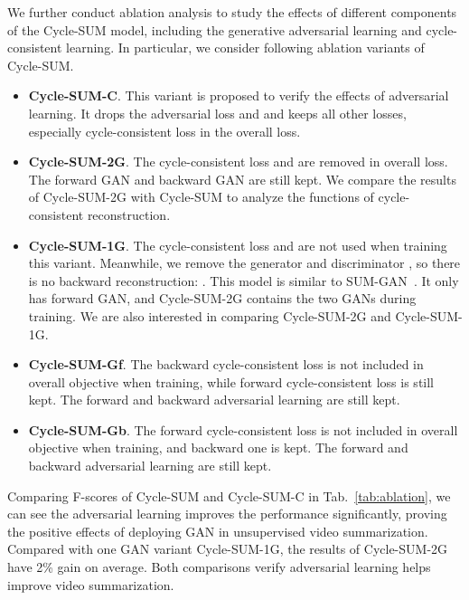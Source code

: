 \documentclass[letterpaper]{article} \usepackage{aaai19}  \usepackage{times}  \usepackage{helvet}  \usepackage{courier}  \usepackage{url}  \usepackage{graphicx}  \frenchspacing  \setlength{\pdfpagewidth}{8.5in}  \setlength{\pdfpageheight}{11in}  \usepackage{amsmath}
\begin{document}
We further conduct ablation analysis to study the effects of different components of the Cycle-SUM model, including the generative adversarial learning and cycle-consistent learning. In particular, we consider following ablation variants of Cycle-SUM.
\begin{itemize}

\item \textbf{Cycle-SUM-C}. This variant is proposed to verify the effects of adversarial learning. It drops the adversarial loss  and  and keeps all other losses, especially cycle-consistent loss  in the overall loss.

\item \textbf{Cycle-SUM-2G}. The cycle-consistent loss  and  are removed in overall loss. The forward GAN and backward GAN are still kept. We compare the results of Cycle-SUM-2G with Cycle-SUM to analyze the functions of cycle-consistent reconstruction.

\item \textbf{Cycle-SUM-1G}. The cycle-consistent loss  and  are not used when training this variant. Meanwhile, we remove the generator  and discriminator , so there is no backward reconstruction: . This model is similar to SUM-GAN~\cite{mahasseni2017unsupervised}. It only has forward GAN, and Cycle-SUM-2G contains the two GANs during training. We are also interested in comparing {Cycle-SUM-2G} and {Cycle-SUM-1G}.

\item \textbf{Cycle-SUM-Gf}.
The backward cycle-consistent loss  is not included in overall objective when training, while forward cycle-consistent loss is still kept. The forward and backward adversarial learning are still kept.

\item \textbf{Cycle-SUM-Gb}.
The forward cycle-consistent loss  is not included in overall objective when training, and backward one is kept. The forward and backward adversarial learning are still kept.

\end{itemize}









Comparing F-scores of Cycle-SUM and Cycle-SUM-C in Tab.~\ref{tab:ablation}, we can see the adversarial learning improves the performance significantly, proving the positive effects of deploying GAN in unsupervised video summarization. Compared with one GAN variant Cycle-SUM-1G, the results of Cycle-SUM-2G have 2\% gain on average. Both comparisons verify adversarial learning helps improve video summarization.
\end{document}
